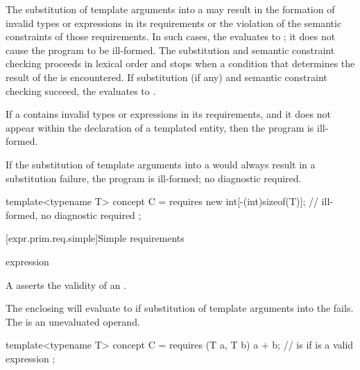 \pnum
The substitution of template arguments into a 
may result in the formation of invalid types or expressions in its
requirements or the violation of the semantic constraints of those requirements.
In such cases, the  evaluates to ;
it does not cause the program to be ill-formed.
The substitution and semantic constraint checking
proceeds in lexical order and stops when a condition that
determines the result of the  is encountered.
If substitution (if any) and semantic constraint checking succeed,
the  evaluates to .
\begin{note}
If a  contains invalid types or expressions in
its requirements, and it does not appear within the declaration of a templated
entity, then the program is ill-formed.
\end{note}
If the substitution of template arguments into a 
would always result in a substitution failure, the program is ill-formed;
no diagnostic required.
\begin{example}
\begin{codeblock}
template<typename T> concept C =
requires {
  new int[-(int)sizeof(T)];     // ill-formed, no diagnostic required
};
\end{codeblock}
\end{example}

[expr.prim.req.simple]{Simple requirements}
%

\begin{bnf}
\br
    expression \terminal{;}
\end{bnf}

\pnum
A  asserts
the validity of an .
\begin{note}
The enclosing  will evaluate to 
if substitution of template arguments into the  fails.
The  is an unevaluated operand.
\end{note}
\begin{example}
\begin{codeblock}
template<typename T> concept C =
  requires (T a, T b) {
    a + b;          //  is  if  is a valid expression
  };
\end{codeblock}
\end{example}

